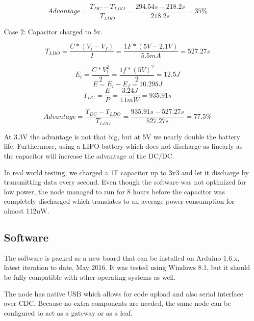 $$Advantage = \frac{T_{DC} - T_{LDO}}{T_{LDO}} = \frac{294.54s - 218.2s}{218.2s} =  35\%$$

Case 2: Capacitor charged to 5v.

$$T_{LDO} = \frac{C * (V_i - V_f)}{I}=\frac{1F * (5V - 2.1V)}{5.5mA} = 527.27s $$

$$E_i = \frac{C*V_i^2}{2} = \frac{1f*(5V)^2}{2} =12.5J$$
$$E = E_i - E_f = 10.295J$$
$$T_{DC} = \frac{E}{P} = \frac{3.24J}{11mW} =935.91s $$

$$Advantage = \frac{T_{DC} - T_{LDO}}{T_{LDO}} = \frac{935.91s - 527.27s}{527.27s} = 77.5\%$$

At 3.3V the advantage is not that big, but at 5V we nearly double the battery life. Furthermore, using a LIPO
battery which does not discharge as linearly as the capacitor will increase the
advantage of the DC/DC.

In real world testing, we charged a 1F capacitor up to 3v3 and let it discharge by transmitting data every second. Even though the software was not
optimized for low power, the node managed to run for 8 hours before the capacitor was completely
discharged which translates to an average power consumption for almost 112uW.


\subsection{Software}

The software is packed as a new board that can be installed on Arduino 1.6.x, latest iteration to date,
May 2016. It was tested using Windows 8.1, but it should be fully compatible with other operating systems as well.

The node has native USB which allows for code upload and also serial interface over CDC. Because no
extra components are needed, the same node can be configured to act as a gateway or
as a leaf.


